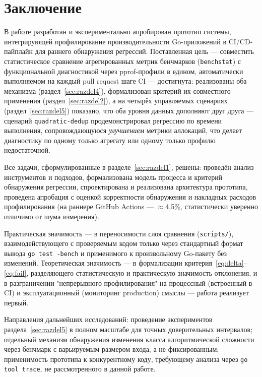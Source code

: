 \section*{Заключение}

В работе разработан и экспериментально апробирован прототип системы,
интегрирующей профилирование производительности Go-приложений в
CI/CD-пайплайн для раннего обнаружения регрессий. Поставленная цель —
совместить статистическое сравнение агрегированных метрик бенчмарков
(\texttt{benchstat}) с функциональной диагностикой через pprof-профили в
едином, автоматически выполняемом на каждый pull request шаге CI —
достигнута: реализованы оба механизма (раздел~\ref{sec:razdel4}),
формализован критерий их совместного применения
(раздел~\ref{sec:razdel2}), а на четырёх управляемых сценариях
(раздел~\ref{sec:razdel5}) показано, что оба уровня данных дополняют друг
друга — сценарий \texttt{quadratic-dedup} продемонстрировал регрессию по
времени выполнения, сопровождающуюся \emph{улучшением} метрики аллокаций,
что делает диагностику по одному только агрегату или одному только
профилю недостаточной.

Все задачи, сформулированные в разделе~\ref{sec:razdel1}, решены: проведён
анализ инструментов и подходов, формализована модель процесса и критерий
обнаружения регрессии, спроектирована и реализована архитектура
прототипа, проведена апробация с оценкой корректности обнаружения и
накладных расходов профилирования (на раннере GitHub Actions —
$\approx$4,5\%, статистически уверенно отличимо от шума измерения).

Практическая значимость — в переносимости слоя сравнения
(\texttt{scripts/}), взаимодействующего с проверяемым кодом только через
стандартный формат вывода \texttt{go test -bench} и применимого к
произвольному Go-пакету без изменений. Теоретическая значимость — в
формализации критерия~\eqref{eq:delta}--\eqref{eq:fail}, разделяющего
статистическую и практическую значимость отклонения, и в разграничении
"непрерывного профилирования" на процессный (встроенный в CI) и
эксплуатационный (мониторинг production) смыслы — работа реализует
первый.

Направления дальнейших исследований: проведение экспериментов
раздела~\ref{sec:razdel5} в полном масштабе для точных доверительных
интервалов; отдельный механизм обнаружения изменения класса
алгоритмической сложности через бенчмарк с варьируемым размером входа, а
не фиксированным; применимость прототипа к конкурентному коду, требующему
анализа через \texttt{go tool trace}, не рассмотренного в данной работе.
